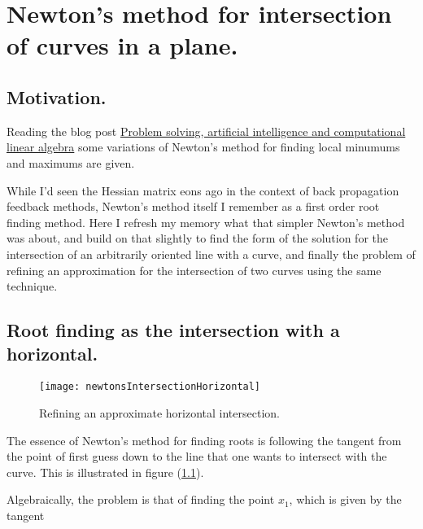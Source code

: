 %


\chapter{Newton's method for intersection of curves in a plane.}
\label{chap:intersectionNewton}
{}
\date{Mar 7, 2010}

\beginArtNoToc

\section{Motivation.}

Reading the blog post \href{http://www.cafelinear.com/2010/02/problem-solving-artificial-intelligence-and-linear-algebra/}{Problem solving, artificial intelligence and computational linear algebra} some variations of Newton's method for finding local minumums and maximums are given.

While I'd seen the Hessian matrix eons ago in the context of back propagation feedback methods, Newton's method itself I remember as a first order root finding method.  Here I refresh my memory what that simpler Newton's method was about, and build on that slightly to find the form of the solution for the intersection of an arbitrarily oriented line with a curve, and finally the problem of refining an approximation for the intersection of two curves using the same technique.

\section{Root finding as the intersection with a horizontal.}

\begin{figure}[htp]
\centering
\texttt{[image: newtonsIntersectionHorizontal]}
\caption{Refining an approximate horizontal intersection.}\label{fig:newtonsIntersectionHorizontal}
\end{figure}

The essence of Newton's method for finding roots is following the tangent from the point of first guess down to the line that one wants to intersect with the curve.  This is illustrated in figure (\ref{fig:newtonsIntersectionHorizontal}).

Algebraically, the problem is that of finding the point $x_1$, which is given by the tangent

